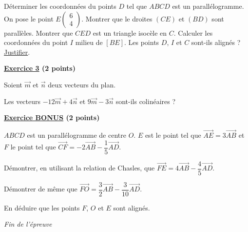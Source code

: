\documentclass[12pt,a4paper]{exam}
\newcommand*{\Coord}[2]{%
  \ensuremath{
    \begin{pmatrix} 
      #1\\[5pt]
      #2 
    \end{pmatrix}}}
\begin{document}
\begin{questions}
    \question[2] Déterminer les coordonnées du points $D$ tel que $ABCD$ est un parallélogramme.
    \question[2] On pose le point $E\Coord{6}{4}$. Montrer que le droites $(CE)$ et $(BD)$ sont parallèles.
    \question[2] Montrer que $CED$ est un triangle isocèle en $C$.
    \question[1] Calculer les coordonnées du point $I$ milieu de $[BE]$.
    \question[2] Les points $D$, $I$ et $C$ sont-ils alignés ? \underline{Justifier}.
\end{questions}

\vspace{1cm}

\noindent
\textbf{\underline{Exercice 3} (2 points)}

\vspace{5pt}
Soient $\vec{m}$ et $\overrightarrow{n}$ deux vecteurs du plan.

\begin{questions}

\question[2] Les vecteurs $-12\overrightarrow{m}+4\overrightarrow{n}$ et $9\overrightarrow{m}-3\overrightarrow{n}$ sont-ils 
colinéaires ?

\end{questions}

\vspace{1cm}

\textbf{\underline{Exercice BONUS} (2 points)}

$ABCD$ est un parallélogramme de centre $O$. $E$ est le point tel que $\overrightarrow{AE} = 3 
\overrightarrow{AB}$ et $F$ le point tel que $\overrightarrow{CF} = -2 \overrightarrow{AB} - 
\dfrac{1}{5}\overrightarrow{AD}$.

\begin{questions}
    \question[1] Démontrer, en utilisant la relation de Chasles, que $\overrightarrow{FE} = 
    4 \overrightarrow{AB} - \dfrac{4}{5}\overrightarrow{AD}$.

    \question[1] Démontrer de même que $\overrightarrow{FO} = \dfrac{3}{2}\overrightarrow{AB} - 
    \dfrac{3}{10}\overrightarrow{AD}$.

    \question[1] En déduire que les points $F$, $O$ et $E$ sont alignés.
\end{questions}




\vspace{0.5cm}

\begin{center}
    \textit{Fin de l'épreuve}
\end{center}
\end{document}
